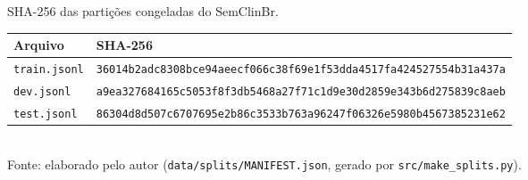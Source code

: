 \begin{quadro}[htbp]
  \centering
  \caption{SHA-256 das partições congeladas do SemClinBr.}
  \label{quad:sha256}
  {\scriptsize
  \begin{tabular}{ll}
  \toprule
  Arquivo & SHA-256 \\
  \midrule
  \texttt{train.jsonl} & \texttt{36014b2adc8308bce94aeecf066c38f69e1f53dda4517fa424527554b31a437a} \\
  \texttt{dev.jsonl} & \texttt{a9ea327684165c5053f8f3db5468a27f71c1d9e30d2859e343b6d275839c8aeb} \\
  \texttt{test.jsonl} & \texttt{86304d8d507c6707695e2b86c3533b763a96247f06326e5980b4567385231e62} \\
  \bottomrule
  \end{tabular}}
  \\[4pt]
  {\footnotesize Fonte: elaborado pelo autor (\texttt{data/splits/MANIFEST.json}, gerado por \texttt{src/make\_splits.py}).}
\end{quadro}
